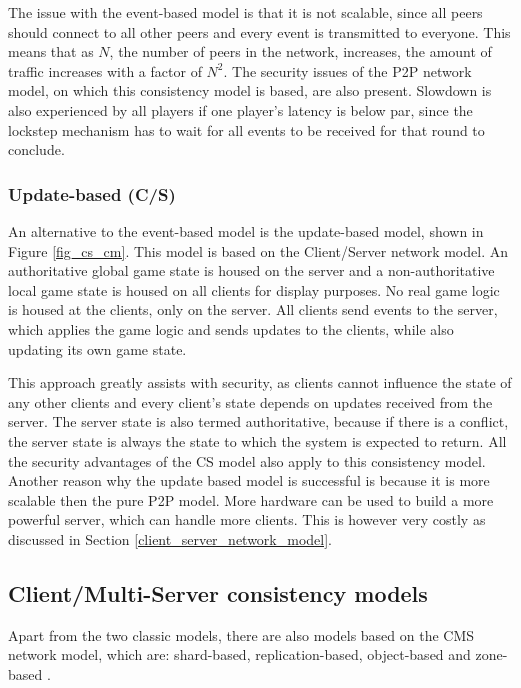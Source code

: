 \documentclass[10pt,a4paper,journal,cspaper,compsoc]{IEEEtran}
\begin{document}
The issue with the event-based model is that it is not scalable, since all peers should connect to all other peers and every event is transmitted to
everyone. This means that as $N$, the number of peers in the network, increases, the amount of traffic increases with a factor of $N^2$. The security
issues of the P2P network model, on which this consistency model is based, are also present. Slowdown is also experienced by all players if one
player's latency is below par, since the lockstep mechanism has to wait for all events to be received for that round to conclude.

\subsubsection{Update-based (C/S)}
An alternative to the event-based model is the update-based model, shown in Figure \ref{fig_cs_cm}. This model is based on the Client/Server network
model. An authoritative global game state is housed on the server and a non-authoritative local game state is housed on all clients for display
purposes. No real game logic is housed at the clients, only on the server. All clients send events to the server, which applies the game logic and
sends updates to the clients, while also updating its own game state.

This approach greatly assists with security, as clients cannot influence the state of any other clients and every client's state depends on updates
received from the server. The server state is also termed authoritative, because if there is a conflict, the server state is always the state to
which the system is expected to return. All the security advantages of the \ac{CS} model also apply to this consistency model. Another reason why the
update based model is successful is because it is more scalable then the pure P2P model. More hardware can be used to build a more powerful server,
which can handle more clients. This is however very costly as discussed in Section \ref{client_server_network_model}.

\subsection{Client/Multi-Server consistency models}
\label{cms_models}


Apart from the two classic models, there are also models based on the \ac{CMS} network model, which are: shard-based, replication-based, object-based
and zone-based \cite{Hu_voronoi_IM}.
\end{document}
